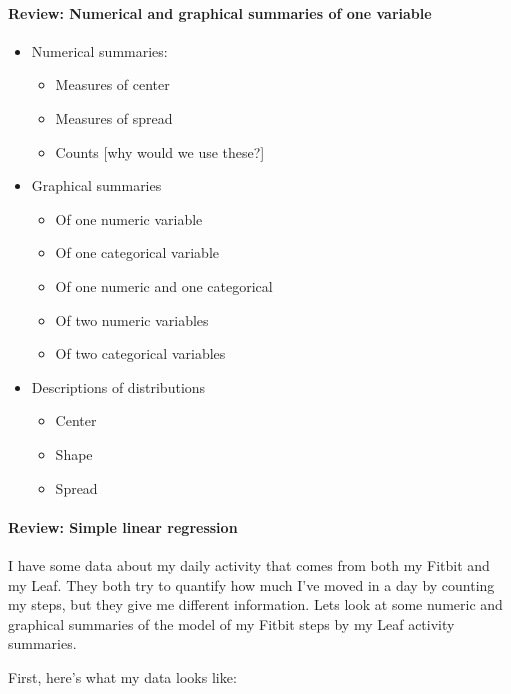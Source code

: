 \documentclass[10pt]{article}\usepackage[]{graphicx}\usepackage[]{color}
\begin{document}
\paragraph{Review: Numerical and graphical summaries of one variable}

\begin{itemize}

\item Numerical summaries:
\begin{itemize}

\item Measures of center
\item Measures of spread
\item Counts [why would we use these?]
\end{itemize}
\item Graphical summaries
\begin{itemize}

\item Of one numeric variable
\item Of one categorical variable
\item Of one numeric and one categorical
\item Of two numeric variables
\item Of two categorical variables
\end{itemize}
\item Descriptions of distributions
\begin{itemize}

\item Center
\item Shape
\item Spread
\end{itemize}
\end{itemize}

\paragraph{Review: Simple linear regression}

I have some data about my daily activity that comes from both my Fitbit and my Leaf. They both try to quantify how much I've moved in a day by counting my steps, but they give me different information. Lets look at some numeric and graphical summaries of the model of my Fitbit steps by my Leaf activity summaries. 

First, here's what my data looks like:
\end{document}
